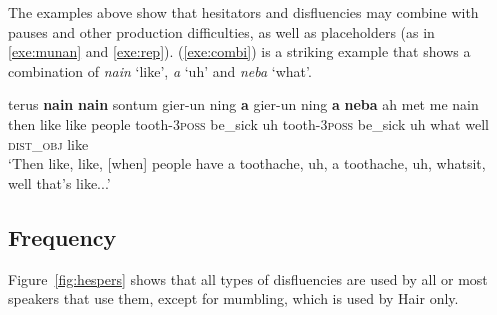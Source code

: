 \documentclass[output=paper,colorlinks,citecolor=brown
\ChapterDOI{10.5281/zenodo.15697587}
]{langscibook}
\begin{document}

The examples above show that hesitators and disfluencies may combine with pauses and other production difficulties, as well as placeholders (as in \ref{exe:munan} and \ref{exe:rep}). (\ref{exe:combi}) is a striking example that shows a combination of \textit{nain} `like', \textit{a} `uh' and \textit{neba} `what'.%

\ea 	\label{exe:combi}
\gll terus \textbf{nain} \textbf{nain} sontum gier-un ning \textbf{a} gier-un ning \textbf{a} \textbf{neba} ah met me nain\\
then like like people tooth-\textsc{3poss} be\_sick uh tooth-\textsc{3poss} be\_sick uh what well \textsc{dist\_obj} {\glme} like\\
\glt 	`Then like, like, [when] people have a toothache, uh, a toothache, uh, whatsit, well that's like...' 
\z 

\subsection{Frequency}
Figure~\ref{fig:hespers} shows that all types of disfluencies are used by all or most speakers that use them, except for mumbling, which is used by Hair only.
\end{document}
